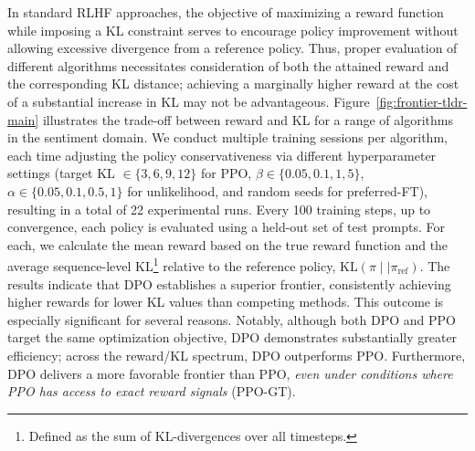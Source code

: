 In standard RLHF approaches, the objective of maximizing a reward function while imposing a KL constraint serves to encourage policy improvement without allowing excessive divergence from a reference policy. Thus, proper evaluation of different algorithms necessitates consideration of both the attained reward and the corresponding KL distance; achieving a marginally higher reward at the cost of a substantial increase in KL may not be advantageous. Figure~\ref{fig:frontier-tldr-main} illustrates the trade-off between reward and KL for a range of algorithms in the sentiment domain. We conduct multiple training sessions per algorithm, each time adjusting the policy conservativeness via different hyperparameter settings (target KL $\in\{3,6,9,12\}$ for PPO, $\beta \in \{0.05,0.1,1,5\}$, $\alpha\in\{0.05,0.1,0.5,1\}$ for unlikelihood, and random seeds for preferred-FT), resulting in a total of 22 experimental runs. Every 100 training steps, up to convergence, each policy is evaluated using a held-out set of test prompts. For each, we calculate the mean reward based on the true reward function and the average sequence-level KL\footnote{Defined as the sum of KL-divergences over all timesteps.} relative to the reference policy, $\text{KL}\left(\pi\mid \mid \pi_\text{ref}\right)$. The results indicate that DPO establishes a superior frontier, consistently achieving higher rewards for lower KL values than competing methods. This outcome is especially significant for several reasons. Notably, although both DPO and PPO target the same optimization objective, DPO demonstrates substantially greater efficiency; across the reward/KL spectrum, DPO outperforms PPO. Furthermore, DPO delivers a more favorable frontier than PPO, \emph{even under conditions where PPO has access to exact reward signals} (PPO-GT).

